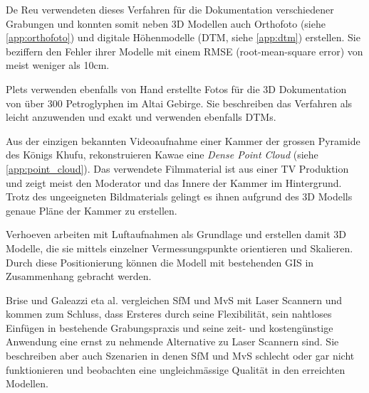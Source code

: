 			De Reu \etal \cite{DeReu20131108} verwendeten dieses Verfahren für die Dokumentation verschiedener Grabungen und konnten somit neben 3D Modellen auch Orthofoto (siehe \autoref{app:orthofoto}) und digitale Höhenmodelle (DTM, siehe \autoref{app:dtm}) erstellen. Sie beziffern den Fehler ihrer Modelle mit einem RMSE (root-mean-square error) von meist weniger als 10cm.
			
			Plets \etal \cite{altai} verwenden ebenfalls von Hand erstellte Fotos für die 3D Dokumentation von über 300 Petroglyphen im Altai Gebirge. Sie beschreiben das Verfahren als leicht anzuwenden und exakt und verwenden ebenfalls DTMs.
			
			Aus der einzigen bekannten Videoaufnahme einer Kammer der grossen Pyramide des Königs Khufu, rekonstruieren Kawae \etal \cite{the_cave} eine \emph{Dense Point Cloud} (siehe \autoref{app:point_cloud}). Das verwendete Filmmaterial ist aus einer TV Produktion und zeigt meist den Moderator und das Innere der Kammer im Hintergrund. Trotz des ungeeigneten Bildmaterials gelingt es ihnen aufgrund des 3D Modells genaue Pläne der Kammer zu erstellen.
			
			Verhoeven \etal \cite{ARP:ARP399, ARCM:ARCM667} arbeiten mit Luftaufnahmen als Grundlage und erstellen damit 3D Modelle, die sie mittels einzelner Vermessungspunkte orientieren und Skalieren. Durch diese Positionierung können die Modell mit bestehenden GIS in Zusammenhang gebracht werden.
			
			Brise \etal \cite{TUW-210216} und Galeazzi eta al. \cite{arch:laser_vs_dense_stereo} vergleichen SfM und MvS mit Laser Scannern und kommen zum Schluss, dass Ersteres durch seine Flexibilität, sein nahtloses Einfügen in bestehende Grabungspraxis und seine zeit- und kostengünstige Anwendung eine ernst zu nehmende Alternative zu Laser Scannern sind. Sie beschreiben aber auch Szenarien in denen SfM und MvS schlecht oder gar nicht funktionieren und beobachten eine ungleichmässige Qualität in den erreichten Modellen.